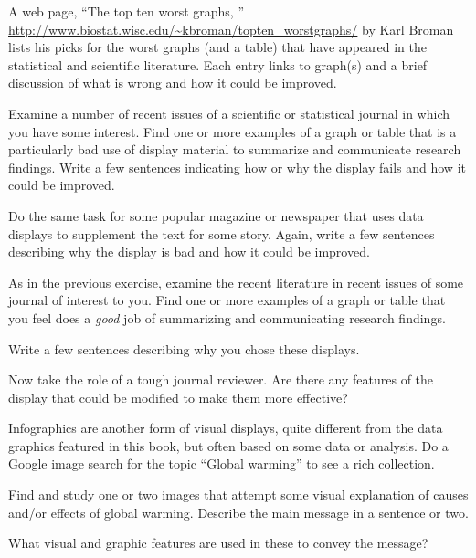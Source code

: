 
\begin{Exercises}

 \exercise A web page, ``The top ten worst graphs, '' \url{http://www.biostat.wisc.edu/~kbroman/topten_worstgraphs/} by Karl Broman lists his picks for the worst graphs (and a table) that have appeared in the
 statistical and scientific literature.  Each entry links to graph(s) and a brief discussion of
 what is wrong and how it could be improved. 
 \begin{enumerate*}
   \item Examine a number of recent issues of a scientific or statistical journal in which you
   have some interest.  Find one or more examples of a graph or table that is a particularly
   bad use of display material to summarize and communicate research findings. Write a
   few sentences indicating how or why the display fails and how it could be improved.
   \item Do the same task for some popular magazine or newspaper that uses data displays
   to supplement the text for some story. Again, write a few sentences describing why the
   display is bad and how it could be improved.
 \end{enumerate*}
 
 \exercise As in the previous exercise, examine the recent literature in recent issues of some
 journal of interest to you.  Find one or more examples of a graph or table that you feel
 does a \emph{good} job of summarizing and communicating research findings.
 \begin{enumerate*}
   \item Write a few sentences describing why you chose these displays.
   \item Now take the role of a tough journal reviewer.  Are there any features of the
   display that could be modified to make them more effective?
 \end{enumerate*}
 
 \exercise Infographics are another form of visual displays, quite different from the
 data graphics featured in this book, but often based on some data or analysis.
 Do a Google image search for the topic ``Global warming'' to see a rich
 collection.
 \begin{enumerate*}
   \item Find and study one or two images that attempt some visual explanation of causes
   and/or effects of global warming.  Describe the main message in a sentence or
   two.
   \item What visual and graphic features are used in these to convey the message?
 \end{enumerate*}


\end{Exercises}
